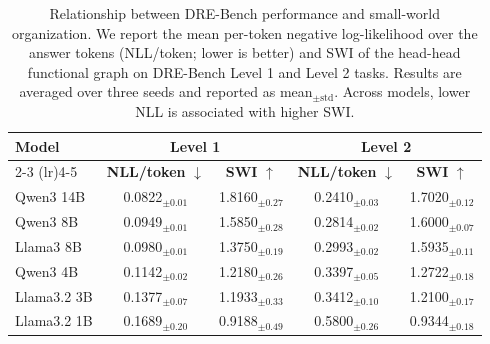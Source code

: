 \begin{table}[t]
\centering
\small
\setlength{\tabcolsep}{4pt}

\caption{\small Relationship between DRE-Bench performance and small-world organization.
We report the mean per-token negative log-likelihood over the answer tokens (NLL/token; lower is better) and SWI of the head-head functional graph on DRE-Bench Level 1 and Level 2 tasks. Results are averaged over three seeds and reported as mean$_{\pm \text{std}}$. Across models, lower NLL is associated with higher SWI.}

\begin{tabular}{lcccc}
\toprule
\textbf{Model} 
& \multicolumn{2}{c}{\textbf{Level 1}} 
& \multicolumn{2}{c}{\textbf{Level 2}} \\
\cmidrule(lr){2-3} \cmidrule(lr){4-5}
& \textbf{NLL/token} $\downarrow$
& \textbf{SWI} $\uparrow$
& \textbf{NLL/token} $\downarrow$
& \textbf{SWI} $\uparrow$ \\
\midrule
Qwen3 14B 
& 0.0822$_{\scriptstyle \pm 0.01}$ & 1.8160$_{\scriptstyle \pm 0.27}$
& 0.2410$_{\scriptstyle \pm 0.03}$ & 1.7020$_{\scriptstyle \pm 0.12}$ \\
Qwen3 8B 
& 0.0949$_{\scriptstyle \pm 0.01}$ & 1.5850$_{\scriptstyle \pm 0.28}$
& 0.2814$_{\scriptstyle \pm 0.02}$ & 1.6000$_{\scriptstyle \pm 0.07}$\\
Llama3 8B 
& 0.0980$_{\scriptstyle \pm 0.01}$ & 1.3750$_{\scriptstyle \pm 0.19}$
& 0.2993$_{\scriptstyle \pm 0.02}$ & 1.5935$_{\scriptstyle \pm 0.11}$ \\
Qwen3 4B 
& 0.1142$_{\scriptstyle \pm 0.02}$ & 1.2180$_{\scriptstyle \pm 0.26}$
& 0.3397$_{\scriptstyle \pm 0.05}$ & 1.2722$_{\scriptstyle \pm 0.18}$ \\
Llama3.2 3B 
& 0.1377$_{\scriptstyle \pm 0.07}$ & 1.1933$_{\scriptstyle \pm 0.33}$
& 0.3412$_{\scriptstyle \pm 0.10}$ & 1.2100$_{\scriptstyle \pm 0.17}$ \\
Llama3.2 1B 
& 0.1689$_{\scriptstyle \pm 0.20}$ & 0.9188$_{\scriptstyle \pm 0.49}$
& 0.5800$_{\scriptstyle \pm 0.26}$ & 0.9344$_{\scriptstyle \pm 0.18}$ \\
\bottomrule
\end{tabular}
\vspace{-0.5cm}

\label{tab:dre_perf_swi_levels}
\end{table}
